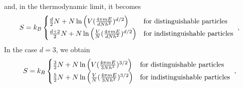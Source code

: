     and, in the thermodynamic limit, it becomes
    \begin{equation*}
        S = k_B \begin{cases}
            \frac{d}{2} N + N \ln \Big ( V (\frac{4 \pi m E}{d N h^2})^{d/2} \Big) & \textnormal{for distinguishable particles} \\
            \frac{d + 2}{2} N + N \ln \Big ( \frac{V}{N} (\frac{4 \pi m E}{d N h^2})^{d/2} \Big) & \textnormal{for indistinguishable particles} \\
        \end{cases} ~,
    \end{equation*}
    In the case $d = 3$, we obtain 
    \begin{equation*}
        S = k_B \begin{cases}
            \frac{3}{2} N + N \ln \Big ( V (\frac{4 \pi m E}{3 N h^2})^{3/2} \Big) & \textnormal{for distinguishable particles} \\
            \frac{5}{2} N + N \ln \Big ( \frac{V}{N} (\frac{4 \pi m E}{3 N h^2})^{3/2} \Big) & \textnormal{for indistinguishable particles} \\
        \end{cases} ~,
    \end{equation*}
